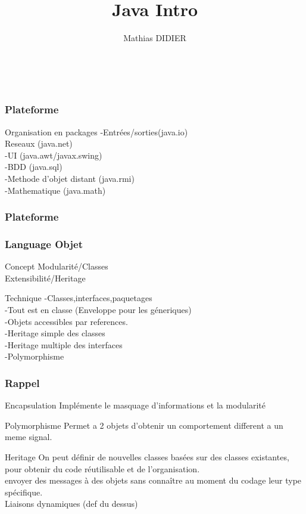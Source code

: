 \documentclass[12pt,a4paper,twoside]{beamer}
\begin{document}
\author{Mathias DIDIER}\\
\title{Java Intro}
\maketitle
\begin{frame}
\frametitle{Plateforme}
\begin{block}{Organisation en packages}
-Entrées/sorties(java.io)\\
Reseaux (java.net)\\
-UI (java.awt/javax.swing)\\
-BDD (java.sql)\\
-Methode d'objet distant (java.rmi)\\
-Mathematique (java.math)\\
\end{block}
\end{frame}
\begin{frame}
\frametitle{Plateforme}
\end{frame}
\begin{frame}
\frametitle{Language Objet}
\begin{block}{Concept}
Modularité/Classes\\
Extensibilité/Heritage\\
\end{block}
\begin{block}{Technique}
-Classes,interfaces,paquetages\\
-Tout est en classe (Enveloppe pour les géneriques)\\
-Objets accessibles par references.\\
-Heritage simple des classes\\
-Heritage multiple des interfaces\\
-Polymorphisme\\
\end{block}
\end{frame}
\begin{frame}
\frametitle{Rappel}
\begin{block}{Encapsulation}
Implémente le masquage d'informations et la modularité\\
\end{block}
\begin{block}{Polymorphisme}
Permet a 2 objets d'obtenir un comportement different a un meme signal.\\
\end{block}
\begin{block}{Heritage}
On peut définir de nouvelles classes basées sur des classes existantes, pour obtenir du code réutilisable et de l'organisation. \\
envoyer des messages à des objets sans 
connaître au moment du codage leur type spécifique.\\
Liaisons dynamiques (def du dessus)\\
\end{block}
\end{frame}
\end{document}
